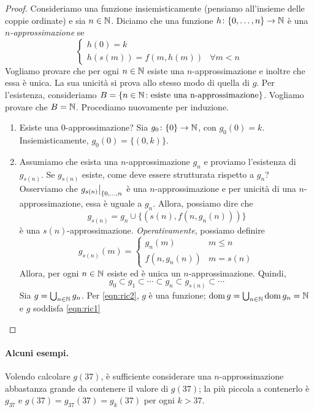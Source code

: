 \begin{proof}
  Consideriamo una funzione insiemisticamente (pensiamo all'insieme delle coppie ordinate) e sia \(n \in \mathbb{N}\). Diciamo che una funzione \(h \colon \lbrace 0,\dots,n \rbrace \to \mathbb{N}\) è una \emph{\(n\)-approssimazione} se
  \begin{equation}
    \begin{cases}
      h(0) = k \\ h(s(m)) = f(m, h(m)) & \forall m < n
    \end{cases}
  \end{equation}
  Vogliamo provare che per ogni \(n \in \mathbb{N}\) esiste una \(n\)-approssimazione e inoltre che essa è unica. La sua unicità si prova allo stesso modo di quella di \(g\). Per l'esistenza, consideriamo \(B = \lbrace n \in \mathbb{N} \colon \text{esiste una n-approssimazione} \rbrace\). Vogliamo provare che \(B = \mathbb{N}\). Procediamo nuovamente per induzione.
  \begin{enumerate}
    \item Esiste una \(0\)-approssimazione? Sia \(g_0 \colon \lbrace 0 \rbrace \to \mathbb{N}\), con \(g_0(0) = k\). Insiemisticamente, \(g_0(0) = \lbrace (0,k) \rbrace\).
    \item Assumiamo che esista una \(n\)-approssimazione \(g_n\) e proviamo l'esistenza di \(g_{s(n)}\). Se \(g_{s(n)}\) esiste, come deve essere strutturata rispetto a \(g_n\)? Osserviamo che \(\restr{g_{s(n)}}{\lbrace 0,\dots,n}\) è una \(n\)-approssimazione e per unicità di una \(n\)-approssimazione, essa è uguale a \(g_n\). Allora, possiamo dire che
    \[
    g_{s(n)} = g_n \cup \lbrace (s(n), f(n, g_n(n))) \rbrace
    \]
    è una \(s(n)\)-approssimazione. \emph{Operativamente}, possiamo definire
    \[g_{s(n)}(m) =
    \begin{cases}
      g_n(m) & m \le n \\ f(n,g_n(n)) & m = s(n)
    \end{cases}
    \]
    Allora, per ogni \(n \in \mathbb{N}\) esiste ed è unica un \(n\)-approssimazione. Quindi,
    \begin{equation}
    g_0 \subset g_1 \subset \dotsb \subset g_n \subset g_{s(n)} \subset \dotsb \label{eqn:ric2}
  \end{equation}
    Sia \(g = \bigcup_{n \in \mathbb{N}} g_n\). Per \eqref{eqn:ric2}, \(g\) è una funzione; \(\operatorname{dom} g = \bigcup_{n \in \mathbb{N}} \operatorname{dom} g_n = \mathbb{N}\) e \(g\) soddisfa \eqref{eqn:ric1}
  \end{enumerate}
\end{proof}

\paragraph{Alcuni esempi.} Volendo calcolare \(g(37)\), è sufficiente considerare una \(n\)-approssimazione abbastanza grande da contenere il valore di \(g(37)\); la più piccola a contenerlo è \(g_{37}\) e \(g(37) = g_{37}(37) = g_k(37)\) per ogni \(k > 37\).

